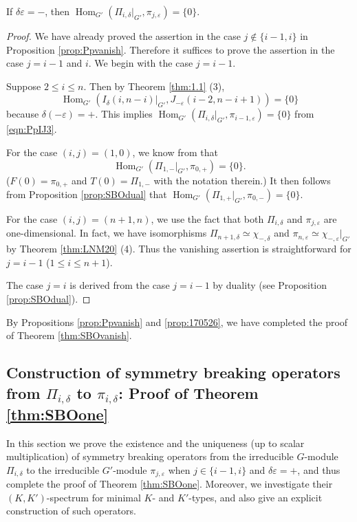 \begin{proposition}
\label{prop:170526}
If $\delta \varepsilon =-$, 
 then 
$
   {\operatorname{Hom}}_{G'}(\Pi_{i,\delta}|_{G'}, \pi_{j,\varepsilon})
   =
   \{0\}.
$
\end{proposition}
\newpage
\begin{proof}
We have already proved the assertion in the case 
 $j \not \in \{i-1,i\}$
 in Proposition \ref{prop:Ppvanish}.  
Therefore it suffices to prove 
 the assertion in the case $j=i-1$ and $i$.  
We begin with the case $j=i-1$.  


Suppose $2 \le i \le n$.  
Then by Theorem \ref{thm:1.1} (3), 
\[
   {\operatorname{Hom}}_{G'}(I_{\delta}(i,n-i)|_{G'}, J_{-\varepsilon}(i-2,n-i+1))
   =
   \{0\}
\]
because $\delta (-\varepsilon) =+$.  
This implies 
$
   {\operatorname{Hom}}_{G'}
   (\Pi_{i,\delta}|_{G'}, \pi_{i-1,\varepsilon})
   =
   \{0\}
$ from \eqref{eqn:PpIJ3}.    



For the case
 $(i,j)=(1,0)$, 
 we know from \cite[Thm.~2.5 (1-a)]{sbon}
 that
\[
   {\operatorname{Hom}}_{G'}
   (\Pi_{1,-}|_{G'}, \pi_{0,+})
   =
   \{0\}.  
\]
($F(0)=\pi_{0,+}$ and $T(0)=\Pi_{1,-}$ with the notation therein.)
It then follows from  Proposition \ref{prop:SBOdual}
 that 
$
   {\operatorname{Hom}}_{G'}
   (\Pi_{1,+}|_{G'}, \pi_{0,-})=\{0\}
$.  



For the case $(i,j)=(n+1,n)$, 
 we use the fact 
 that both $\Pi_{i,\delta}$ and $\pi_{j,\varepsilon}$ are 
 one-dimensional.  
In fact,
 we have isomorphisms
 $\Pi_{n+1,\delta} \simeq \chi_{-,\delta}$
 and $\pi_{n,\varepsilon} \simeq \chi_{-,\varepsilon}|_{G'}$
 by Theorem \ref{thm:LNM20} (4).  
Thus the vanishing assertion is straightforward for $j=i-1$
 ($1 \le i \le n+1$).  



The case $j=i$ is derived from the case $j=i-1$
 by duality
 (see Proposition \ref{prop:SBOdual}). 
\end{proof}



By Propositions \ref{prop:Ppvanish} and \ref{prop:170526}, 
 we have completed the proof of Theorem \ref{thm:SBOvanish}.  



\subsection{Construction of symmetry breaking operators from 
 $\Pi_{i,\delta}$ to $\pi_{i,\delta}$: 
Proof of Theorem \ref{thm:SBOone}}
\label{subsec:StageCii}
In this section we prove
 the existence and the uniqueness 
 (up to scalar multiplication) of symmetry breaking operators from 
 the irreducible $G$-module $\Pi_{i,\delta}$ 
 to the irreducible $G'$-module $\pi_{j,\varepsilon}$
 when $j \in \{i-1,i\}$ and $\delta \varepsilon= +$, 
 and thus complete the proof of Theorem \ref{thm:SBOone}.  
Moreover,
 we investigate their $(K,K')$-spectrum
 for 
minimal $K$- and $K'$-types,
 and also give an explicit construction of such operators.  

